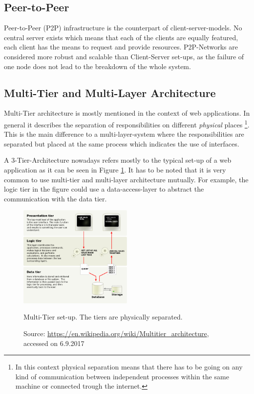\subsection{Peer-to-Peer}
Peer-to-Peer (P2P) infrastructure is the counterpart of client-server-models. No central server exists which means that each of the clients are equally featured, each client has the means to request and provide resources. P2P-Networks are considered more robust and scalable than Client-Server set-ups, as the failure of one node does not lead to the breakdown of the whole system.

\subsection{Multi-Tier and Multi-Layer Architecture}
\label{sec:multi-tier}
Multi-Tier architecture is mostly mentioned in the context of web applications. In general it describes the separation of responsibilities on different \emph{physical} places \footnote{In this context physical separation means that there has to be going on any kind of communication between independent processes within the same machine or connected trough the internet.}. This is the main difference to a multi-layer-system where the responsibilities are separated but placed at the same process which indicates the use of interfaces. 

A 3-Tier-Architecture nowadays refers mostly to the typical set-up of a web application as it can be seen in Figure \ref{fig:multi-tier}. It has to be noted that it is very common to use multi-tier and multi-layer architecture mutually. For example, the logic tier in the figure could use a data-access-layer to abstract the communication with the data tier. 

\begin{figure}[htbp]
	\centering
	\label{fig:multi-tier}
	\includegraphics[width=0.5\textwidth]{./content/pictures/multi-tier.jpg}
	\caption{Multi-Tier set-up. The tiers are physically separated.}
	\caption*{Source: \href{https://en.wikipedia.org/wiki/Multitier\_architecture}{https://en.wikipedia.org/wiki/Multitier\_architecture}, accessed on 6.9.2017}
\end{figure}


